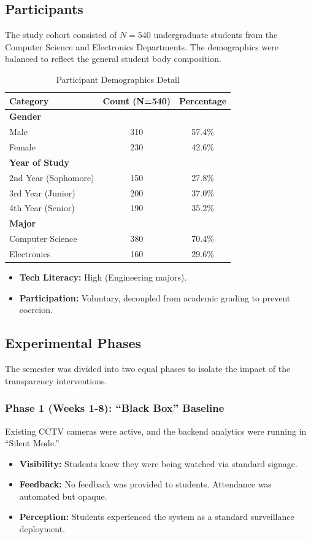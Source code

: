 \documentclass[conference]{IEEEtran}
\begin{document}
\subsection{Participants}
The study cohort consisted of $N=540$ undergraduate students from the Computer Science and Electronics Departments. The demographics were balanced to reflect the general student body composition.

\begin{table}[htbp]
\caption{Participant Demographics Detail}
\begin{center}
\begin{tabular}{lcc}
\toprule
\textbf{Category} & \textbf{Count (N=540)} & \textbf{Percentage} \\
\midrule
\textbf{Gender} & & \\
Male & 310 & 57.4\% \\
Female & 230 & 42.6\% \\
\midrule
\textbf{Year of Study} & & \\
2nd Year (Sophomore) & 150 & 27.8\% \\
3rd Year (Junior) & 200 & 37.0\% \\
4th Year (Senior) & 190 & 35.2\% \\
\midrule
\textbf{Major} & & \\
Computer Science & 380 & 70.4\% \\
Electronics & 160 & 29.6\% \\
\bottomrule
\end{tabular}
\end{center}
\label{tab:demographics}
\end{table}

\begin{itemize}
    \item \textbf{Tech Literacy:} High (Engineering majors).
    \item \textbf{Participation:} Voluntary, decoupled from academic grading to prevent coercion.
\end{itemize}

\subsection{Experimental Phases}
The semester was divided into two equal phases to isolate the impact of the transparency interventions.

\subsubsection{Phase 1 (Weeks 1-8): ``Black Box'' Baseline}
Existing CCTV cameras were active, and the backend analytics were running in ``Silent Mode.''
\begin{itemize}
    \item \textbf{Visibility:} Students knew they were being watched via standard signage.
    \item \textbf{Feedback:} No feedback was provided to students. Attendance was automated but opaque.
    \item \textbf{Perception:} Students experienced the system as a standard surveillance deployment.
\end{itemize}
\end{document}
